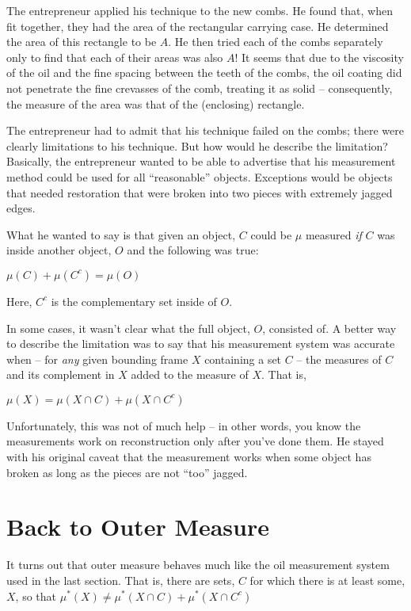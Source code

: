 \documentclass{article}
\begin{document}
The entrepreneur applied his technique to the new combs. 
He found that, when fit together, they had the area of the rectangular carrying case.
He determined the area of this rectangle to be $A$. He then tried each of the 
combs separately only to find that each of their areas was also $A$!
It seems that due to the viscosity of the oil and the fine spacing between the 
teeth of the combs, the oil coating did not penetrate the fine crevasses of the 
comb, treating it as solid -- consequently, the measure of the area was that of the (enclosing) rectangle.


The entrepreneur had to admit that his technique failed on the combs; 
there were clearly limitations to his technique. 
But how would he describe the limitation? Basically, the entrepreneur wanted to 
be able to advertise that his measurement method could be used for all ``reasonable'' objects. 
Exceptions would be objects that needed restoration that were broken into two pieces with extremely jagged edges.

What he wanted to say is that given an object, $C$ could be $\mu$ measured 
{\em if\/} $C$ was inside another object, $O$ and the following was true:

$\mu(C) + \mu(C^c) = \mu(O)$

Here, $C^c$ is the complementary set inside of $O$.

In some cases, it wasn't clear what the full object, $O$, consisted of. A better way 
to describe the limitation was to say that his measurement system was accurate 
when -- for {\em any\/} given bounding frame $X$ containing a set $C$ -- 
the measures of $C$ and 
its complement in $X$ added to the measure of $X$. That is,

$\mu(X) = \mu(X \cap C) + \mu(X \cap C^c)$

Unfortunately, this was not of much help -- in other words, you know the 
measurements work on reconstruction only after you've done them.
He stayed with his original caveat that the measurement works when some object has 
broken as long as the pieces are not ``too'' jagged.


\section{Back to Outer Measure}
It turns out that outer measure behaves much like the oil measurement system 
used in the last section. That is, there are sets, $C$ for which there is at 
least some, $X$, so that
$\mu^*(X) \neq \mu^*(X \cap C) + \mu^*(X \cap C^c)$
\end{document}
